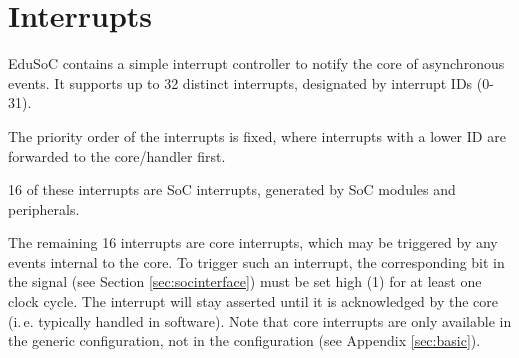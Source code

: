 \newpage
\section{Interrupts}\label{sec:interrupts}
EduSoC contains a simple interrupt controller to notify the core of asynchronous events. It supports up to 32 distinct interrupts, designated by interrupt IDs (0-31).

The priority order of the interrupts is fixed, where interrupts with a lower ID are forwarded to the core/handler first.

16 of these interrupts are SoC interrupts, generated by SoC modules and peripherals.

The remaining 16 interrupts are core interrupts, which may be triggered by any events internal to the core.
To trigger such an interrupt, the corresponding bit in the  signal (see Section \ref{sec:socinterface}) must be set high (1) for at least one clock cycle. The interrupt will stay asserted until it is acknowledged by the core (i.\,e. typically handled in software). Note that core interrupts are only available in the generic  configuration, not in the  configuration (see Appendix \ref{sec:basic}).

